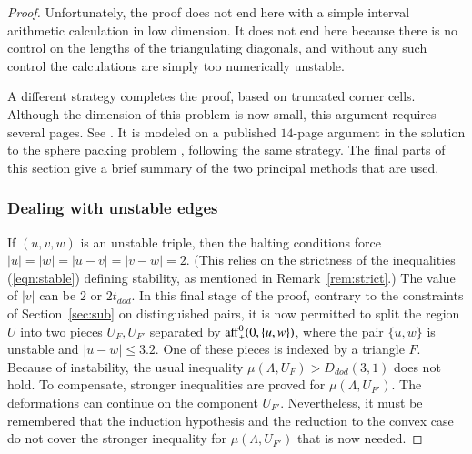 \documentclass{article} %
\begin{document}
\begin{proof}
Unfortunately, the proof does not end here with a simple interval
arithmetic calculation in low dimension.  It does not end
here because there is no control on the
lengths of the triangulating diagonals, and without any such
control the calculations are simply too numerically unstable.


A different strategy completes the proof, based on truncated
corner cells.  Although the dimension of this problem is now small,
this argument requires several pages.
See \cite[pp.30-38]{Hales:2002:Dodec}.  It is modeled on a published
$14$-page argument in the solution to the sphere packing problem
\cite[\S\S13.2-13.11]{Hales:2006:DCG}, following the same strategy.
The final parts of this section give a brief summary of the two principal  methods that are used.

\subsubsection{Dealing with unstable edges}
If $(u,v,w)$ is an unstable triple, then the
halting conditions force $|u|=|w|=|u-v|=|v-w|=2$.  (This
relies on the strictness of the inequalities (\ref{eqn:stable})
defining stability,
as mentioned in Remark~\ref{rem:strict}.)
The value of $|v|$ can be $2$ or $2t_{dod}$. In this final
stage of the proof, contrary to the constraints of Section~\ref{sec:sub}
on distinguished pairs,
it is now permitted to split the region $U$ into two pieces
$U_F,U_{F'}$ separated by ${\operatorname{aff}}_+^0(0,\{u,w\})$, where
the pair $\{u,w\}$ is unstable and $|u-w|\le 3.2$.  
One of these pieces is indexed
by a triangle $F$.  Because of instability, the usual inequality
$\mu(\Lambda,U_F)> D_{dod}(3,1)$ does not hold.  To compensate,
stronger inequalities are proved for $\mu(\Lambda,U_{F'})$.
The deformations can continue on the component $U_{F'}$. Nevertheless,
it must be remembered that the induction hypothesis and the 
reduction to the convex case do not cover the stronger 
inequality for $\mu(\Lambda,U_{F'})$ that is now needed.


\end{proof}
\end{document}
